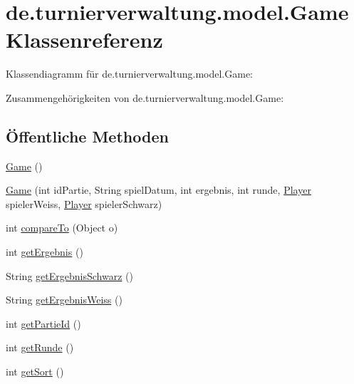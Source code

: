 \hypertarget{classde_1_1turnierverwaltung_1_1model_1_1_game}{}\section{de.\+turnierverwaltung.\+model.\+Game Klassenreferenz}
\label{classde_1_1turnierverwaltung_1_1model_1_1_game}


Klassendiagramm für de.\+turnierverwaltung.\+model.\+Game\+:


Zusammengehörigkeiten von de.\+turnierverwaltung.\+model.\+Game\+:
\subsection*{Öffentliche Methoden}
\begin{DoxyCompactItemize}
\item 
\hyperlink{classde_1_1turnierverwaltung_1_1model_1_1_game_a9824178ba5fb3813d2324814b018e1c1}{Game} ()
\item 
\hyperlink{classde_1_1turnierverwaltung_1_1model_1_1_game_ac74d0f8b593301c7377b98e7b616a2fb}{Game} (int id\+Partie, String spiel\+Datum, int ergebnis, int runde, \hyperlink{classde_1_1turnierverwaltung_1_1model_1_1_player}{Player} spieler\+Weiss, \hyperlink{classde_1_1turnierverwaltung_1_1model_1_1_player}{Player} spieler\+Schwarz)
\item 
int \hyperlink{classde_1_1turnierverwaltung_1_1model_1_1_game_a3d9ae1f392743aa050d585420f6c3004}{compare\+To} (Object o)
\item 
int \hyperlink{classde_1_1turnierverwaltung_1_1model_1_1_game_ad7d72da8a85947e6f2f30de255a4c853}{get\+Ergebnis} ()
\item 
String \hyperlink{classde_1_1turnierverwaltung_1_1model_1_1_game_a0a32da532dbe1f813cb8a9789a2e6ebd}{get\+Ergebnis\+Schwarz} ()
\item 
String \hyperlink{classde_1_1turnierverwaltung_1_1model_1_1_game_a49feec384ad5bbe2b31814f25596697a}{get\+Ergebnis\+Weiss} ()
\item 
int \hyperlink{classde_1_1turnierverwaltung_1_1model_1_1_game_aaac5f699d7e3f1a519854434d3ead2bc}{get\+Partie\+Id} ()
\item 
int \hyperlink{classde_1_1turnierverwaltung_1_1model_1_1_game_ae1d3faaf11e5beeb373748226c8a023f}{get\+Runde} ()
\item 
int \hyperlink{classde_1_1turnierverwaltung_1_1model_1_1_game_ada3468ec4a68780fd8e1701cecbba5a9}{get\+Sort} ()

\end{DoxyCompactItemize}
